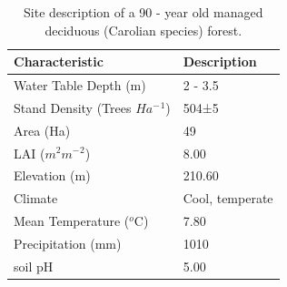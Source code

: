 \documentclass[]{elsarticle} %
\begin{document}
\begin{table}[!h]

\caption{\label{tab:site_info-1}\label{tab:site_description} Site description of a 90 - year old managed deciduous (Carolian species) forest.}
\centering
\fontsize{8}{10}\selectfont
\begin{tabular}[t]{ll}
\toprule
Characteristic & Description\\
\midrule
\rowcolor{gray!6}  Water Table Depth (m) & 2 - 3.5\\
Stand Density (Trees $Ha^-$$^1$) & 504±5\\
\rowcolor{gray!6}  Area (Ha) & 49\\
LAI ($m^2 m^-$$^2$) & 8.00\\
\rowcolor{gray!6}  Elevation (m) & 210.60\\
\addlinespace
Climate & Cool, temperate\\
\rowcolor{gray!6}  Mean Temperature ($^o$C) & 7.80\\
Precipitation (mm) & 1010\\
\rowcolor{gray!6}  soil pH & 5.00\\
\bottomrule
\end{tabular}
\end{table}

\begin{table}[!h]

\caption{\label{tab:site_info-2}\label{tab:topography} Selected values of soil nutrient content of litter fall horizon (LFH), Turkey Point Deciduous (TPD).}
\centering
{}
\end{table}
\end{document}
